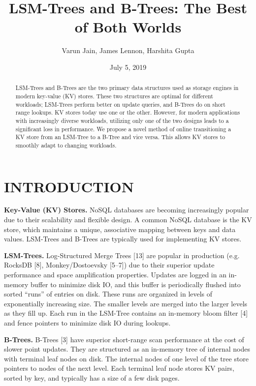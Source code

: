\documentclass[a4paper,12pt,notitlepage,twoside,openright]{article}
\title{LSM-Trees and B-Trees: The Best of Both Worlds}
\author{Varun Jain, James Lennon, Harshita Gupta}
\date{July 5, 2019}
\begin{document}
\maketitle

\begin{abstract}

LSM-Trees and B-Trees are the two primary data structures used as
storage engines in modern key-value (KV) stores. These two structures
are optimal for different workloads; LSM-Trees perform better on update
queries, and B-Trees do on short range lookups. KV stores today use one
or the other. However, for modern applications with increasingly diverse
workloads, utilizing only one of the two designs leads to a significant
loss in performance. We propose a novel method of online transitioning a
KV store from an LSM-Tree to a B-Tree and vice versa. This allows KV
stores to smoothly adapt to changing workloads.

\end{abstract}

\hypertarget{introduction}{%
\section{INTRODUCTION}\label{introduction}}

\textbf{Key-Value (KV) Stores.} NoSQL databases are becoming increasingly popular
due to their scalability and flexible design. A common NoSQL database is
the KV store, which maintains a unique, associative mapping between keys
and data values. LSM-Trees and B-Trees are typically used for
implementing KV stores.

\textbf{LSM-Trees.} Log-Structured Merge Trees {[}13{]} are popular in production
(e.g. RocksDB {[}8{]}, Monkey/Dostoevsky {[}5--7{]}) due to their
superior update performance and space amplification properties. Updates
are logged in an in-memory buffer to minimize disk IO, and this buffer
is periodically flushed into sorted ``runs'' of entries on disk. These
runs are organized in levels of exponentially increasing size. The
smaller levels are merged into the larger levels as they fill up. Each
run in the LSM-Tree contains an in-memory bloom filter {[}4{]} and fence
pointers to minimize disk IO during lookups.

\textbf{B-Trees.} B-Trees {[}3{]} have superior short-range scan performance at
the cost of slower point updates. They are structured as an in-memory
tree of internal nodes with terminal leaf nodes on disk. The internal
nodes of one level of the tree store pointers to nodes of the next
level. Each terminal leaf node stores KV pairs, sorted by key, and
typically has a size of a few disk pages.
\end{document}
